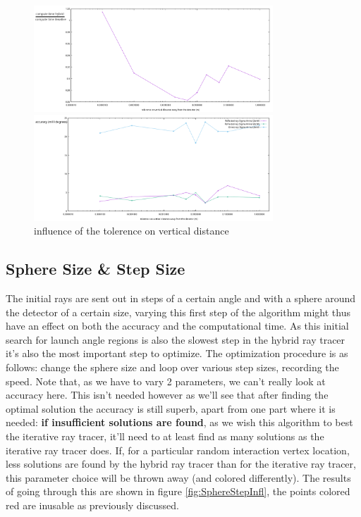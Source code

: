 \documentclass[11pt,a4paper,faculty=we,language=en,doctype=report]{cls/ugent-doc}
\begin{document}
\begin{figure}
	\centering
	\begin{minipage}{\textwidth}
		\includegraphics[width=0.8\textwidth]{figures/ZtolVsTime2.pdf}
	\end{minipage}
	\begin{minipage}{\textwidth}
		\includegraphics[width=0.8\textwidth]{figures/ZtolVsSigmaAZ.pdf}
	\end{minipage}
\caption{influence of the tolerence on vertical distance}
\label{fig:ztolinfl2}
\end{figure}

\subsection{Sphere Size \& Step Size}
The initial rays are sent out in steps of a certain angle and with a sphere
around the detector of a certain size, varying this first step of the algorithm
might thus have an effect on both the accuracy and the computational time. 
As this initial search for launch angle
regions is also the slowest step in the hybrid ray tracer it's also the most important
step to optimize. The optimization procedure is as follows: change the sphere size and loop over various
step sizes, recording the speed. Note that, as we have to vary 2 parameters, we can't really look at accuracy 
here. This isn't needed however as we'll see that after finding the optimal solution the accuracy is still superb,
apart from one part where it is needed: \textbf{if insufficient solutions are found}, as we wish this algorithm to
best the iterative ray tracer, it'll need to at least find as many solutions as the iterative ray tracer does. 
If, for a particular random interaction vertex location, less solutions are found by the hybrid ray tracer
than for the iterative ray tracer, this parameter choice will be thrown away (and colored differently).
The results of going through this are shown in figure \ref{fig:SphereStepInfl}, the points colored red 
are inusable as previously discussed.
\end{document}
